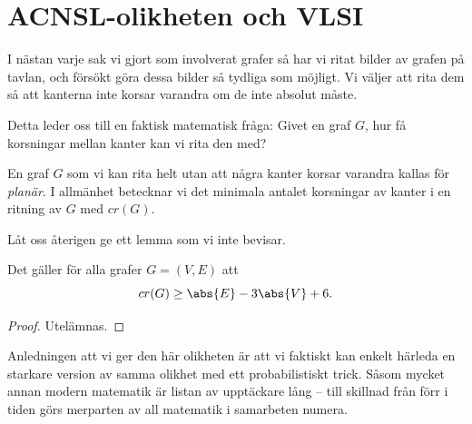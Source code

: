 \documentclass[nobib]{tufte-handout}
\begin{document}
\section{ACNSL-olikheten och VLSI}

I nästan varje sak vi gjort som involverat grafer så har vi ritat bilder av grafen på tavlan, och försökt göra dessa bilder så tydliga som möjligt. Vi väljer att rita dem så att kanterna inte korsar varandra om de inte absolut måste.

Detta leder oss till en faktisk matematisk fråga: Givet en graf $G$, hur få korsningar mellan kanter kan vi rita den med?

\begin{definition}
  En graf $G$ som vi kan rita helt utan att några kanter korsar varandra kallas för \emph{planär}. I allmänhet betecknar vi det minimala antalet korsningar av kanter i en ritning av $G$ med $cr(G)$.
\end{definition}

Låt oss återigen ge ett lemma som vi inte bevisar.

\begin{lemma}\label{newtons_formula_lemma}
  Det gäller för alla grafer $G = (V, E)$ att
  $$cr(G) \geq \abs{E} - 3\abs{V} + 6.$$

  \begin{proof}
    Utelämnas.
  \end{proof}
\end{lemma}

Anledningen att vi ger den här olikheten är att vi faktiskt kan enkelt härleda en starkare version av samma olikhet med ett probabilistiskt trick. Såsom mycket annan modern matematik är listan av upptäckare lång -- till skillnad från förr i tiden görs merparten av all matematik i samarbeten numera.
\end{document}

